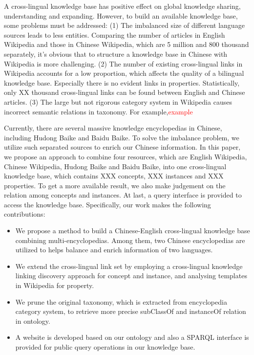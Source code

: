 \documentclass[runningheads,a4paper]{llncs}
\begin{document}
A cross-lingual knowledge base has positive effect on global knowledge sharing, understanding and expanding. However, to build an available knowledge base, some problems must be addressed: (1) The imbalanced size of different language sources leads to less entities. Comparing the number of articles in English Wikipedia and those in Chinese Wikipedia, which are 5 million and 800 thousand separately, it's obvious that to structure a knowledge base in Chinese with Wikipedia is more challenging. (2) The number of existing cross-lingual links in Wikipedia accounts for a low proportion, which affects the quality of a bilingual knowledge base. Especially there is no evident links in properties. Statistically, only XX thousand cross-lingual links can be found between English and Chinese articles. (3) The large but not rigorous category system in Wikipedia causes incorrect semantic relations in taxonomy. For example,\textcolor{red}{example}



Currently, there are several massive knowledge encyclopedias in Chinese, including Hudong Baike and Baidu Baike. To solve the imbalance problem, we utilize such separated sources to enrich our Chinese information. In this paper, we propose an approach to combine four resources, which are English Wikipedia, Chinese Wikipedia, Hudong Baike and Baidu Baike, into one cross-lingual knowledge base, which contains XXX concepts, XXX instances and XXX properties. To get a more available result, we also make judgement on the relation among concepts and instances. At last, a query interface is provided to access the knowledge base. Specifically, our work makes the following contributions:
\begin{itemize}
  \item We propose a method to build a Chinese-English cross-lingual knowledge base combining multi-encyclopedias. Among them, two  Chinese encyclopedias are utilized to helps balance and enrich information of two languages.
  \item We extend the cross-lingual link set by employing a cross-lingual knowledge linking discovery approach for concept and instance, and analysing templates in Wikipedia for property.
  \item We prune the original taxonomy, which is extracted from encyclopedia category system, to retrieve more precise subClassOf and instanceOf relation in ontology.
  \item A website is developed based on our ontology and also a SPARQL interface is provided for public query operations in our knowledge base.
\end{itemize}
\end{document}
